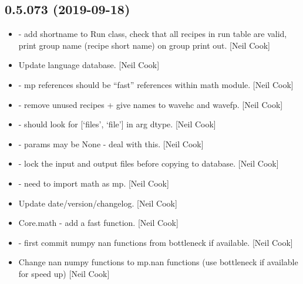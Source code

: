 \documentclass[a4paper,10pt,english]{report}
\begin{document}
\subsection{0.5.073 (2019-09-18)}
\label{\detokenize{misc/changelog:id69}}\begin{itemize}
\item {} 
 - add shortname to Run class,
check that all recipes in run table are valid, print group name
(recipe short name) on group print out. {[}Neil Cook{]}

\item {} 
Update language database. {[}Neil Cook{]}

\item {} 
 - mp references should be “fast” references within
math module. {[}Neil Cook{]}

\item {} 
 - remove unused recipes + give names to
wavehc and wavefp. {[}Neil Cook{]}

\item {} 
 -  should look for {[}‘files’,
‘file’{]} in arg dtype. {[}Neil Cook{]}

\item {} 
 - params may be None - deal with this. {[}Neil
Cook{]}

\item {} 
 - lock the input and output files before copying to
database. {[}Neil Cook{]}

\item {} 
 - need to import math as mp. {[}Neil
Cook{]}

\item {} 
Update date/version/changelog. {[}Neil Cook{]}

\item {} 
Core.math - add a fast  function. {[}Neil Cook{]}

\item {} 
 - first commit numpy nan functions from bottleneck
if available. {[}Neil Cook{]}

\item {} 
Change nan numpy functions to mp.nan functions (use bottleneck if
available for speed up) {[}Neil Cook{]}


\end{itemize}
\end{document}
